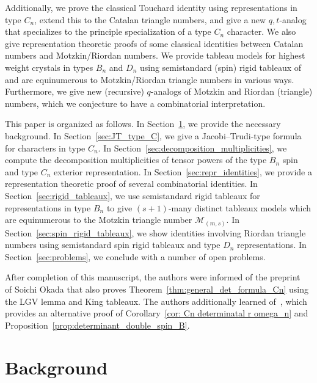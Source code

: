 \documentclass[11pt, leqno]{amsart}
\theoremstyle{plain}
\theoremstyle{definition}
\numberwithin{equation}{section}
\newcommand{\Mot}{\mathcal{M}} %
\begin{document}
Additionally, we prove the classical Touchard identity using representations in type $C_n$, extend this to the Catalan triangle numbers, and give a new $q,t$-analog that specializes to the principle specialization of a type $C_n$ character.
We also give representation theoretic proofs of some classical identities between Catalan numbers and Motzkin/Riordan numbers. 
We provide tableau models for highest weight crystals in types $B_n$ and $D_n$ using semistandard (spin) rigid tableaux of~\cite{KLO17} and are equinumerous to Motzkin/Riordan triangle numbers in various ways.
Furthermore, we give new (recursive) $q$-analogs of Motzkin and Riordan (triangle) numbers, which we conjecture to have a combinatorial interpretation.


This paper is organized as follows.
In Section~\ref{sec:background}, we provide the necessary background.
In Section~\ref{sec:JT_type_C}, we give a Jacobi--Trudi-type formula for characters in type $C_n$.
In Section~\ref{sec:decomposition_multiplicities}, we compute the decomposition multiplicities of tensor powers of the type $B_n$ spin and type $C_n$ exterior representation.
In Section~\ref{sec:repr_identities}, we provide a representation theoretic proof of several combinatorial identities.
In Section~\ref{sec:rigid_tableaux}, we use semistandard rigid tableaux for representations in type $B_n$ to give $(s+1)$-many
distinct tableaux models which are equinumerous to the Motzkin triangle number $\Mot_{(m,s)}$.
In Section~\ref{sec:spin_rigid_tableaux}, we show identities involving Riordan triangle numbers using semistandard spin rigid tableaux and type $D_n$ representations.
In Section~\ref{sec:problems}, we conclude with a number of open problems.

After completion of this manuscript, the authors were informed of the preprint~\cite{Okada89} of Soichi Okada that also proves Theorem~\ref{thm:general_det_formula_Cn} using the LGV lemma and King tableaux. The authors additionally learned of~\cite{Okada09}, which provides an alternative proof of Corollary~\ref{cor: Cn determinatal r omega_n} and Proposition~\ref{prop:determinant_double_spin_B}.


\section{Background}
\label{sec:background}
\end{document}
